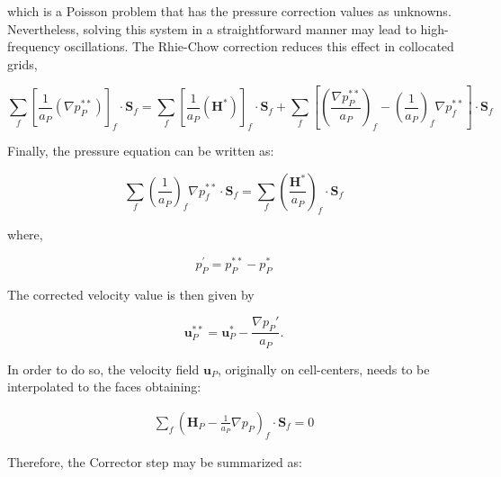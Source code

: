 \documentclass[final,3p,times,10pt,onecolumn]{myElsarticle}
\numberwithin{equation}{section}
\begin{document}

\noindent which is a Poisson problem that has the pressure correction values as unknowns. Nevertheless, solving this system in a straightforward manner may lead to high-frequency oscillations. The Rhie-Chow correction \cite{rhiechow} reduces this effect in collocated grids, 

\begin{equation}
\label{eq:pEqnSIMPLE2}
\sum_f 
\left[
\frac{1}{a_P}
\left(
\nabla p_P^{**}
\right)
\right]_f\cdot \boldsymbol{S}_f 
=
\sum_f 
\left[
\frac{1}{a_P}
\left(
\boldsymbol{H}^*
\right)
\right]_f
\cdot
\boldsymbol{S}_f 
+
\sum_f  
\left[
\left(
\frac{\nabla p_P^{**}}{a_P}
\right)_f
- 
\left(
\frac{1}{a_P}
\right)_f 
\nabla p_f^{**} 
\right]
\cdot 
\boldsymbol{S}_f 
\end{equation}

 Finally, the pressure equation can be written as:



\begin{equation}\label{eq:pEqnSIMPLE3}
\sum_f \left(\frac{1}{a_P}\right)_f \nabla p_f^{**} \cdot \boldsymbol{S}_f =  \sum_f \left(\frac{\boldsymbol{H}^*}{a_P}\right)_f \cdot \boldsymbol{S}_f 
\end{equation}

\noindent where,

\begin{equation}
 p_P^{'} = p_P^{**} - p_P^{*}
\end{equation}

The corrected velocity value is then given by

\begin{equation}\label{eq:SIMPLECorr}
\boldsymbol{u}_P^{**} = \boldsymbol{u}_P^* - \frac{\nabla p_P'}{a_P}.
\end{equation}

\iffalse
 In order to do so, the velocity field $\boldsymbol{u}_P$, originally on cell-centers, needs to be interpolated to the faces obtaining: 

 \begin{equation}
 \begin{split}
 \sum_{f} \left( \boldsymbol{H}_P - \frac{1}{a_P} \nabla p_P  \right)_f \cdotp \textbf{S}_{f} = 0 
 \end{split}
 \label{eq:pEq1} 
 \end{equation}

Therefore, the Corrector step may be summarized as:
\end{document}
